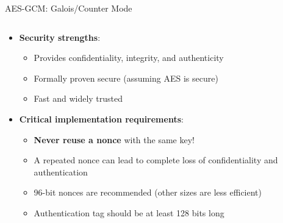 \documentclass[aspectratio=169, lualatex, handout]{beamer}
\begin{document}
\begin{frame}{AES-GCM: Galois/Counter Mode}
	\begin{columns}[c]
		\begin{column}{1\textwidth}
			\begin{itemize}[<+->]
				\item \textbf{Security strengths}:
				      \begin{itemize}
					      \item Provides confidentiality, integrity, and authenticity
					      \item Formally proven secure (assuming AES is secure)
					      \item Fast and widely trusted
				      \end{itemize}
				\item \textbf{Critical implementation requirements}:
				      \begin{itemize}
					      \item \textbf{Never reuse a nonce} with the same key!
					      \item A repeated nonce can lead to complete loss of confidentiality and authentication
					      \item 96-bit nonces are recommended (other sizes are less efficient)
					      \item Authentication tag should be at least 128 bits long
				      \end{itemize}
			\end{itemize}
		\end{column}
	\end{columns}
\end{frame}
\end{document}
